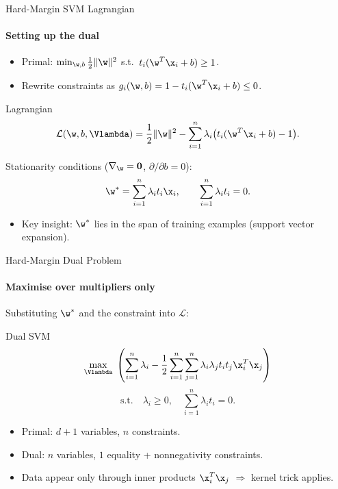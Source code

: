 \begin{frame}{Hard-Margin SVM Lagrangian}
  \framesubtitle{Setting up the dual}
  \begin{itemize}
    \item Primal: $\min_{\w,b} \tfrac{1}{2}\|\w\|^2$ s.t.\ $t_i(\w^T\x_i+b)\ge 1$.
    \item Rewrite constraints as $g_i(\w,b) = 1 - t_i(\w^T\x_i+b) \le 0$.
  \end{itemize}
  \begin{block}{Lagrangian}
    \[
      \mathcal{L}(\w,b,\Vlambda) = \frac{1}{2}\|\w\|^2
      - \sum_{i=1}^n \lambda_i\bigl(t_i(\w^T\x_i+b) - 1\bigr).
    \]
  \end{block}
  Stationarity conditions ($\nabla_\w = \mathbf{0}$, $\partial/\partial b = 0$):
  \[
    \w^* = \sum_{i=1}^n \lambda_i t_i \x_i, \qquad
    \sum_{i=1}^n \lambda_i t_i = 0.
  \]
  \begin{itemize}
    \item \alert{Key insight}: $\w^*$ lies in the span of training examples (support vector expansion).
  \end{itemize}
\end{frame}

\begin{frame}{Hard-Margin Dual Problem}
  \framesubtitle{Maximise over multipliers only}
  Substituting $\w^*$ and the constraint into $\mathcal{L}$:
  \begin{block}{Dual SVM}
    \[
      \max_{\Vlambda} \;\left(\sum_{i=1}^n \lambda_i -
      \frac{1}{2}\sum_{i=1}^n\sum_{j=1}^n \lambda_i\lambda_j t_i t_j \x_i^T\x_j\right)
    \]
    \[
      \text{s.t.}\quad \lambda_i \ge 0, \quad \sum_{i=1}^n \lambda_i t_i = 0.
    \]
  \end{block}
  \begin{itemize}
    \item Primal: $d+1$ variables, $n$ constraints.
    \item Dual: $n$ variables, $1$ equality + nonnegativity constraints.
    \item Data appear only through \alert{inner products} $\x_i^T\x_j$ $\Rightarrow$ kernel trick applies.
  \end{itemize}
\end{frame}

